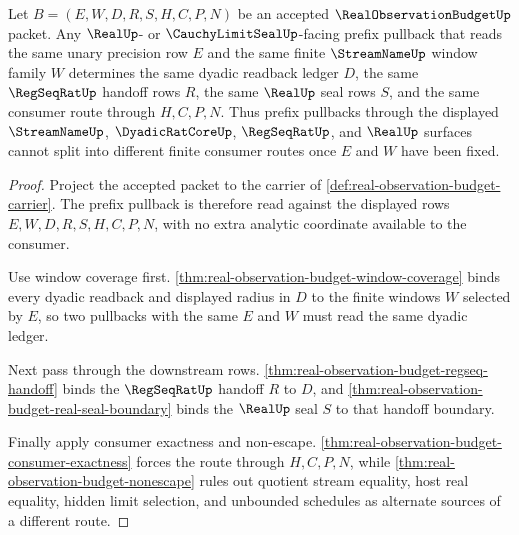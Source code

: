 \begin{theorem}
\label{thm:real-observation-budget-prefix-pullback-determinacy}
Let $B=(E,W,D,R,S,H,C,P,N)$ be an accepted $\RealObservationBudgetUp$ packet. Any $\RealUp$- or $\CauchyLimitSealUp$-facing prefix pullback that reads the same unary precision row $E$ and the same finite $\StreamNameUp$ window family $W$ determines the same dyadic readback ledger $D$, the same $\RegSeqRatUp$ handoff rows $R$, the same $\RealUp$ seal rows $S$, and the same consumer route through $H,C,P,N$. Thus prefix pullbacks through the displayed $\StreamNameUp$, $\DyadicRatCoreUp$, $\RegSeqRatUp$, and $\RealUp$ surfaces cannot split into different finite consumer routes once $E$ and $W$ have been fixed.
\end{theorem}
\begin{proof}
Project the accepted packet to the carrier of \autoref{def:real-observation-budget-carrier}. The prefix pullback is therefore read against the displayed rows $E,W,D,R,S,H,C,P,N$, with no extra analytic coordinate available to the consumer.

Use window coverage first. \autoref{thm:real-observation-budget-window-coverage} binds every dyadic readback and displayed radius in $D$ to the finite windows $W$ selected by $E$, so two pullbacks with the same $E$ and $W$ must read the same dyadic ledger.

Next pass through the downstream rows. \autoref{thm:real-observation-budget-regseq-handoff} binds the $\RegSeqRatUp$ handoff $R$ to $D$, and \autoref{thm:real-observation-budget-real-seal-boundary} binds the $\RealUp$ seal $S$ to that handoff boundary.

Finally apply consumer exactness and non-escape. \autoref{thm:real-observation-budget-consumer-exactness} forces the route through $H,C,P,N$, while \autoref{thm:real-observation-budget-nonescape} rules out quotient stream equality, host real equality, hidden limit selection, and unbounded schedules as alternate sources of a different route.
\end{proof}

